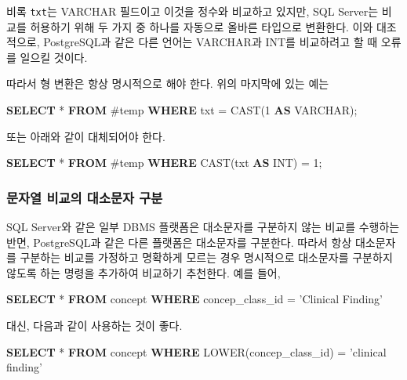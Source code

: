 \documentclass[10.5pt]{book}
\newenvironment{Shaded}{\begin{snugshade}}{\end{snugshade}}
\newcommand{\KeywordTok}[1]{\textcolor[rgb]{0.13,0.29,0.53}{\textbf{#1}}}
\newcommand{\DataTypeTok}[1]{\textcolor[rgb]{0.13,0.29,0.53}{#1}}
\newcommand{\DecValTok}[1]{\textcolor[rgb]{0.00,0.00,0.81}{#1}}
\newcommand{\StringTok}[1]{\textcolor[rgb]{0.31,0.60,0.02}{#1}}
\newcommand{\FunctionTok}[1]{\textcolor[rgb]{0.00,0.00,0.00}{#1}}
\newcommand{\NormalTok}[1]{#1}
\theoremstyle{definition}
\theoremstyle{definition}
\theoremstyle{definition}
\theoremstyle{remark}
\begin{document}
비록 \texttt{txt}는 VARCHAR 필드이고 이것을 정수와 비교하고 있지만, SQL
Server는 비교를 허용하기 위해 두 가지 중 하나를 자동으로 올바른 타입으로
변환한다. 이와 대조적으로, PostgreSQL과 같은 다른 언어는 VARCHAR과 INT를
비교하려고 할 때 오류를 일으킬 것이다.

따라서 형 변환은 항상 명시적으로 해야 한다. 위의 마지막에 있는 예는

\begin{Shaded}
\begin{Highlighting}[]
\KeywordTok{SELECT}\NormalTok{ * }\KeywordTok{FROM}\NormalTok{ #temp }\KeywordTok{WHERE}\NormalTok{ txt = }\FunctionTok{CAST}\NormalTok{(}\DecValTok{1} \KeywordTok{AS} \DataTypeTok{VARCHAR}\NormalTok{);}
\end{Highlighting}
\end{Shaded}

또는 아래와 같이 대체되어야 한다.

\begin{Shaded}
\begin{Highlighting}[]
\KeywordTok{SELECT}\NormalTok{ * }\KeywordTok{FROM}\NormalTok{ #temp }\KeywordTok{WHERE} \FunctionTok{CAST}\NormalTok{(txt }\KeywordTok{AS} \DataTypeTok{INT}\NormalTok{) = }\DecValTok{1}\NormalTok{;}
\end{Highlighting}
\end{Shaded}

\subsubsection*{문자열 비교의 대소문자 구분}\label{---}

SQL Server와 같은 일부 DBMS 플랫폼은 대소문자를 구분하지 않는 비교를
수행하는 반면, PostgreSQL과 같은 다른 플랫폼은 대소문자를 구분한다.
따라서 항상 대소문자를 구분하는 비교를 가정하고 명확하게 모르는 경우
명시적으로 대소문자를 구분하지 않도록 하는 명령을 추가하여 비교하기
추천한다. 예를 들어,

\begin{Shaded}
\begin{Highlighting}[]
\KeywordTok{SELECT}\NormalTok{ * }\KeywordTok{FROM}\NormalTok{ concept }\KeywordTok{WHERE}\NormalTok{ concep_class_id = }\StringTok{'Clinical Finding'}
\end{Highlighting}
\end{Shaded}

대신, 다음과 같이 사용하는 것이 좋다.

\begin{Shaded}
\begin{Highlighting}[]
\KeywordTok{SELECT}\NormalTok{ * }\KeywordTok{FROM}\NormalTok{ concept }\KeywordTok{WHERE} \FunctionTok{LOWER}\NormalTok{(concep_class_id) = }\StringTok{'clinical finding'}
\end{Highlighting}
\end{Shaded}
\end{document}
